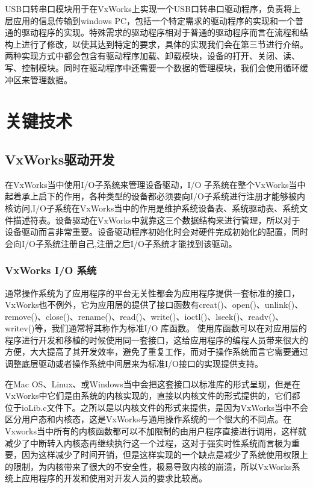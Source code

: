 	USB口转串口模块用于在VxWorks上实现一个USB口转串口驱动程序，负责将上层应用的信息传输到windows PC，包括一个特定需求的驱动程序的实现和一个普通的驱动程序的实现。特殊需求的驱动程序相对于普通的驱动程序而言在流程和结构上进行了修改，以使其达到特定的要求，具体的实现我们会在第三节进行介绍。两种实现方式中都会包含有驱动程序加载、卸载模块，设备的打开、关闭、读、写、控制模块。同时在驱动程序中还需要一个数据的管理模块，我们会使用循环缓冲区来管理数据。


\section{关键技术}

\subsection{VxWorks驱动开发}
	
	在VxWorks当中使用I/O子系统来管理设备驱动，I/O 子系统在整个VxWorks当中起着承上启下的作用，各种类型的设备都必须要向I/O子系统进行注册才能够被内核访问,I/O子系统在VxWorks当中的作用是维护系统设备表、系统驱动表、系统文件描述符表\cite{VxWorks内核解读}\cite{曹桂平2011VxWorks}。设备驱动在VxWorks中就靠这三个数据结构来进行管理，所以对于设备驱动而言非常重要。设备驱动程序初始化时会对硬件完成初始化的配置，同时会向I/O子系统注册自己,注册之后I/O子系统才能找到该驱动。

\subsubsection{VxWorks I/O 系统}
	通常操作系统为了应用程序的平台无关性都会为应用程序提供一套标准的接口，VxWorks也不例外，它为应用层的提供了接口函数有creat()、open()、unlink()、remove()、close()、rename()、read()、write()、ioctl()、lseek()、readv()、writev()等\cite{陈洋2007VxWorks}\cite{Wu2008Implementation}\cite{Zhang2010Design}，我们通常将其称作为标准I/O 库函数。
	使用库函数可以在对应用层的程序进行开发和移植的时候使用同一套接口，这给应用程序的编程人员带来很大的方便，大大提高了其开发效率，避免了重复工作，而对于操作系统而言它需要通过调整底层驱动或者操作系统中间层来为标准I/O接口的实现提供支持。
	
	在Mac OS、Linux、或Windows当中会把这套接口以标准库的形式呈现，但是在VxWorks中它们是由系统的内核实现的，直接以内核文件的形式提供的，它们都位于ioLib.c文件下\cite{VxWorks内核解读}。之所以是以内核文件的形式来提供，是因为VxWorks当中不会区分用户态和内核态，这是VxWorks与通用操作系统的一个很大的不同点。在Vxworks当中所有的内核函数都可以不加限制的由用户程序直接进行调用，这样就减少了中断转入内核态再继续执行这一个过程，这对于强实时性系统而言极为重要，因为这样减少了时间开销，但是这样实现的一个缺点是减少了系统使用权限上的限制，为内核带来了很大的不安全性，极易导致内核的崩溃，所以VxWorks系统上应用程序的开发和使用对开发人员的要求比较高。
		
